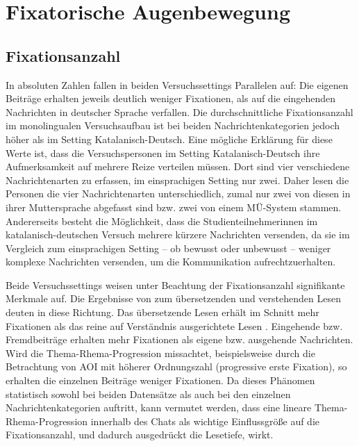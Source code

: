 
\section{Fixatorische Augenbewegung}
\label{K7:sec:fixations}



\subsection{Fixationsanzahl}
\label{K7:subsec:fix-count}



In absoluten Zahlen fallen in beiden Versuchssettings Parallelen auf: Die eigenen Beiträge erhalten jeweils deutlich weniger Fixationen, als auf die eingehenden Nachrichten in deutscher Sprache verfallen. Die durchschnittliche Fixationsanzahl im monolingualen Versuchsaufbau ist bei beiden Nachrichtenkategorien jedoch höher als im Setting Katalanisch-Deutsch. Eine mögliche Erklärung für diese Werte ist, dass die Versuchspersonen im Setting Katalanisch-Deutsch ihre Aufmerksamkeit auf mehrere Reize verteilen müssen. Dort sind vier verschiedene Nachrichtenarten zu erfassen, im einsprachigen Setting nur zwei. Daher lesen die Personen die vier Nachrichtenarten unterschiedlich, zumal nur zwei von diesen in ihrer Muttersprache abgefasst sind bzw. zwei von einem MÜ-System stammen. Andererseits besteht die Möglichkeit, dass die Studienteilnehmer{\textperiodcentered}innen im katalanisch-deutschen Versuch mehrere kürzere Nachrichten versenden, da sie im Vergleich zum einsprachigen Setting -- ob bewusst oder unbewusst -- weniger komplexe Nachrichten versenden, um die Kommunikation aufrechtzuerhalten. 

Beide Versuchssettings weisen unter Beachtung der Fixationsanzahl signifikante Merkmale auf. Die Ergebnisse von \citeauthor{jakobsen_reading_2017} zum übersetzenden und verstehenden Lesen deuten in diese Richtung. Das übersetzende Lesen erhält im Schnitt mehr Fixationen als das reine auf Verständnis ausgerichtete Lesen \citep[36]{jakobsen_reading_2017}. Eingehende bzw. Fremdbeiträge erhalten mehr Fixationen als eigene bzw. ausgehende Nachrichten. Wird die Thema-Rhema-Pro\-gres\-sion missachtet, beispielsweise durch die Betrachtung von AOI mit höherer Ordnungszahl (progressive erste Fixation), so erhalten die einzelnen Beiträge weniger Fixationen. Da dieses Phänomen statistisch sowohl bei beiden Datensätze als auch bei den einzelnen Nachrichtenkategorien auftritt, kann vermutet werden, dass eine lineare Thema-Rhema-Progression innerhalb des Chats als wichtige Einflussgröße auf die Fixationsanzahl, und dadurch ausgedrückt die Lesetiefe, wirkt.

